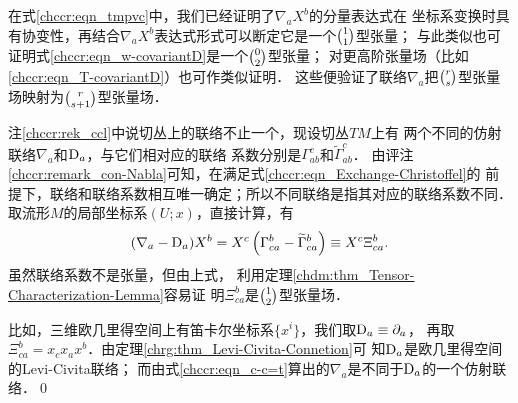 在式\eqref{chccr:eqn_tmpvc}中，我们已经证明了$\nabla_a X^b$的分量表达式在
坐标系变换时具有协变性，再结合$\nabla_a X^b$表达式形式可以断定它是一个$\binom{1}{1}$型张量；
与此类似也可证明式\eqref{chccr:eqn_w-covariantD}是一个$\binom{0}{2}$型张量；
对更高阶张量场（比如\eqref{chccr:eqn_T-covariantD}）也可作类似证明．
这些便验证了联络$\nabla_a$把$\binom{r}{s}$型张量场映射为$\binom{r}{s+1}$型张量场．

\begin{example}\label{chccr:exm_c-c=t}
    注\ref{chccr:rek_ccl}中说切丛上的联络不止一个，现设切丛$TM$上有
    两个不同的仿射联络$\nabla_a$和${\rm D}_a$，与它们相对应的联络
    系数分别是$\Gamma^c_{ab}$和$\widetilde{\Gamma}^c_{ab}$．
    由评注\ref{chccr:remark_con-Nabla}可知，在满足式\eqref{chccr:eqn_Exchange-Christoffel}的
    前提下，联络和联络系数相互唯一确定；所以不同联络是指其对应的联络系数不同．
    取流形$M$的局部坐标系$(U;x)$，直接计算，有
    \begin{equation}\label{chccr:eqn_c-c=t}
        (\nabla_a-{\rm D}_a) X^b  %
        = X^c \left( \Gamma_{ca}^b - \widetilde{\Gamma}_{ca}^b \right)
        \equiv X^c \Xi_{ca}^b .
    \end{equation}
    虽然联络系数不是张量，但由上式，
    利用定理\ref{chdm:thm_Tensor-Characterization-Lemma}容易证
    明$\Xi_{ca}^b$是$\binom{1}{2}$型张量场．
    
    比如，三维欧几里得空间上有笛卡尔坐标系$\{x^i\}$，我们取${\rm D}_a \equiv \partial_a$，
    再取$\Xi_{ca}^b=x_c x_a x^b$．由定理\ref{chrg:thm_Levi-Civita-Connetion}可
    知${\rm D}_a$是欧几里得空间的Levi-Civita联络；
    而由式\eqref{chccr:eqn_c-c=t}算出的$\nabla_a$是不同于${\rm D}_a$的一个仿射联络．\qed
\end{example}



